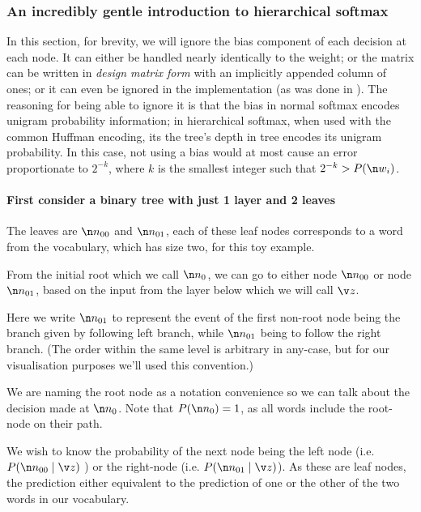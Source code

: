{\subsubsection{An incredibly gentle introduction to hierarchical softmax}
In this section, for brevity, we will ignore the bias component of each decision at each node.
It can either be handled nearly identically to the weight;
or the matrix can be written in \emph{design matrix form} with an implicitly appended column of ones;
or it can even be ignored in the implementation (as was done in \textcite{mikolov2013efficient}).
The reasoning for being able to ignore it is that the bias in normal softmax encodes unigram probability information;
in hierarchical softmax, when used with the common Huffman encoding, its the tree's depth in tree encodes its unigram probability. In this case, not using a bias would at most cause an error proportionate to $2^{-k}$, where $k$ is the smallest integer such that $2^{-k}>P(\n w_i)$.



\paragraph{First consider a binary tree with just 1 layer and 2 leaves}
The leaves are $\n n_{00}$ and $\n n_{01}$, each of these leaf nodes corresponds to a word from the vocabulary, which has size two, for this toy example.

	
From the initial root which we call $\n n_{0}$, we can go to
either node $\n n_{00}$ or node $\n n_{01}$, based on the input from the
layer below which we will call $\v z$.


Here we write $\n n_{01}$ to represent the event of the first non-root
node being the branch given by following left branch, while $\n n_{01}$
being to follow the right branch.
(The order within the same level is arbitrary in any-case, but for our visualisation purposes we'll used this convention.) 

We are naming the root node as a notation convenience so we can talk
about the decision made at $\n n_{0}$. 
Note that $P(\n n_{0})=1$, as all words include the root-node on their path.

We wish to know the probability of the next node being the left node (i.e.
$P(\n n_{00}\mid \v z)$ ) or the right-node (i.e. $P(\n n_{01}\mid \v z)$).
As these are leaf nodes, the prediction either equivalent to the prediction of one or the other of the two words in our vocabulary.

}

